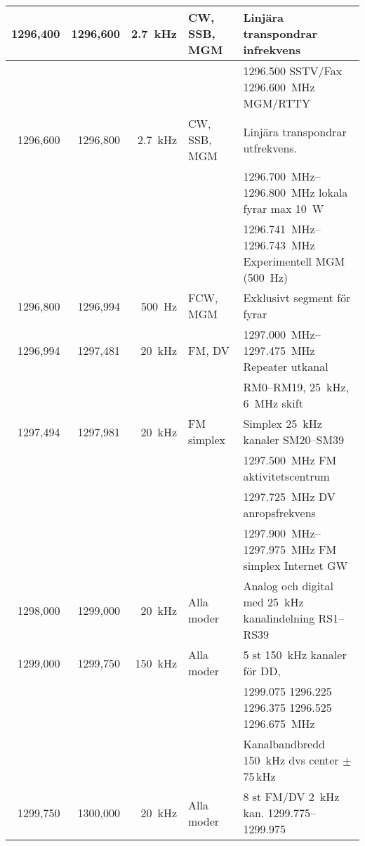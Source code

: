 \begin{tabular}{rrrll}
1296,400 & 1296,600 & \qty{2,7}{\kilo\hertz} & CW, SSB, MGM & Linjära transpondrar infrekvens                               \\ \hline
         &          &                    &                  & \num{1296,500} SSTV/Fax  \qty{1296,600}{\mega\hertz} MGM/RTTY \\ \hline
1296,600 & 1296,800 & \qty{2,7}{\kilo\hertz} & CW, SSB, MGM & Linjära transpondrar utfrekvens.                                \\
	 &          &         &              & \SIrange{1296,700}{1296,800}{\mega\hertz} lokala fyrar max \qty{10}{\watt} \\ 
	 &          &         &              & \SIrange{1296,741}{1296,743}{\mega\hertz} Experimentell MGM (\qty{500}{\hertz}) \\ \hline
1296,800 & 1296,994 & \qty{500}{\hertz}      & FCW, MGM     & Exklusivt segment för fyrar                                   \\ \hline
1296,994 & 1297,481 & \qty{20}{\kilo\hertz}  & FM, DV       & \SIrange{1297,000}{1297,475}{\mega\hertz} Repeater utkanal \\
	 &          &         &              & RM0--RM19, \qty{25}{\kilo\hertz}, \qty{6}{\mega\hertz} skift    \\ \hline
1297,494 & 1297,981 & \qty{20}{\kilo\hertz}  & FM simplex   & Simplex \qty{25}{\kilo\hertz} kanaler SM20--SM39               \\
	 &          &         &              & \qty{1297,500}{\mega\hertz} FM aktivitetscentrum                         \\
	 &          &         &              & \qty{1297,725}{\mega\hertz} DV anropsfrekvens                        \\ \hline
	 &          &         &              & \SIrange{1297,900}{1297,975}{\mega\hertz} FM simplex Internet GW\\ \hline
1298,000 & 1299,000 & \qty{20}{\kilo\hertz} & Alla moder   & Analog och digital med \qty{25}{\kilo\hertz} kanalindelning RS1--RS39 \\ \hline
1299,000 & 1299,750 & \qty{150}{\kilo\hertz} & Alla moder   & 5 st \qty{150}{\kilo\hertz} kanaler för DD,                    \\
	 &          &         &              & \num{1299,075} \num{1296,225} \num{1296,375} \num{1296,525} \qty{1296,675}{\mega\hertz} \\
	 &          &         &              & Kanalbandbredd \qty{150}{\kilo\hertz} dvs center $\pm$75\,kHz  \\ \hline
1299,750 & 1300,000 & \qty{20}{\kilo\hertz}  & Alla moder   & 8 st FM/DV \qty{2}{\kilo\hertz} kan. \numrange{1299,775}{1299,975}
\end{tabular}

\clearpage


\twocolumn
